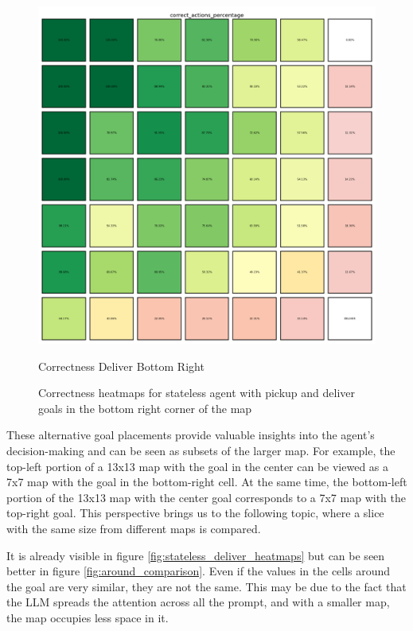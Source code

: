 \begin{figure}[h]
\begin{minipage}[b]{0.45\textwidth}
    \includegraphics[width=\textwidth]{
      images/results_discussion/stateless/not_central/chm_deliver_bottom_right.png
    }
    \caption{Correctness Deliver Bottom Right}
    \label{fig:chm_deliver_bottom_right}
  \end{minipage}
  \caption{Correctness heatmaps for stateless agent with pickup and deliver
  goals in the bottom right corner of the map}
  \label{fig:stateless_bottom_right_correctness}
\end{figure}
\vspace{5mm}

These alternative goal placements provide valuable insights into the agent's
decision-making and can be seen as subsets of the larger map. For example, the
top-left portion of a 13x13 map with the goal in the center can be viewed as a
7x7 map with the goal in the bottom-right cell. At the same time, the bottom-left
portion of the 13x13 map with the center goal corresponds to a 7x7 map with the
top-right goal. This perspective brings us to the following topic, where a slice
with the same size from different maps is compared.

It is already visible in figure \ref{fig:stateless_deliver_heatmaps} but can be
seen better in figure \ref{fig:around_comparison}. Even if the values in the cells
around the goal are very similar, they are not the same. This may be due to the fact
that the LLM spreads the attention across all the prompt, and with a smaller map,
the map occupies less space in it.

